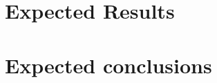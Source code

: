 
\section{Expected Results}
\label{sec:expected-results}



\section{Expected conclusions}
\label{sec:expected-conclusions}


